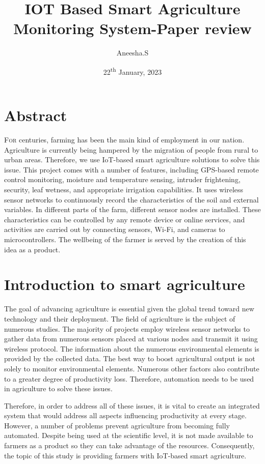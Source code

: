 \documentclass{wsdcr}
\title{IOT Based Smart Agriculture Monitoring System-Paper review}
\author{Aneesha.S}
\affil{Reg.No:21011101020\\
\textit{B.Tech Artificial intelligence and datascience}\\
\textit{Shiv nadar university-chennai}\\
E-mail: aneesha21110377@snuchennai.edu.in}
\date{22\textsuperscript{th} January, 2023}
\begin{document}
\maketitle

\section{Abstract}
\lettrine {F}{or }centuries, farming has been the main kind of employment in our nation. Agriculture is currently being hampered by the migration of people from rural to urban areas. Therefore, we use IoT-based smart agriculture solutions to solve this issue. This project comes with a number of features, including GPS-based remote control monitoring, moisture and temperature sensing, intruder frightening, security, leaf wetness, and appropriate irrigation capabilities. It uses wireless sensor networks to continuously record the characteristics of the soil and external variables. In different parts of the farm, different sensor nodes are installed. These characteristics can be controlled by any remote device or online services, and activities are carried out by connecting sensors, Wi-Fi, and cameras to microcontrollers. The wellbeing of the farmer is served by the creation of this idea as a product.


\section{Introduction to smart agriculture}
The goal of advancing agriculture is essential given the global trend toward new technology and their deployment. The field of agriculture is the subject of numerous studies. The majority of projects employ wireless sensor networks to gather data from numerous sensors placed at various nodes and transmit it using wireless protocol. The information about the numerous environmental elements is provided by the collected data. The best way to boost agricultural output is not solely to monitor environmental elements.
Numerous other factors also contribute to a greater degree of productivity loss. Therefore, automation needs to be used in agriculture to solve these issues.

Therefore, in order to address all of these issues, it is vital to create an integrated system that would address all aspects influencing productivity at every stage.
However, a number of problems prevent agriculture from becoming fully automated. Despite being used at the scientific level, it is not made available to farmers as a product so they can take advantage of the resources. Consequently, the topic of this study is providing farmers with IoT-based smart agriculture.
\end{document}
